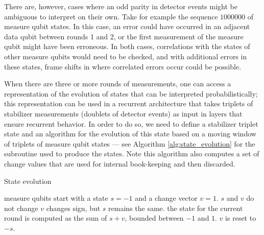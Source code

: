 There are, however, cases where an odd parity in detector events might be ambiguous to interpret on their own. Take for example the sequence $1000000$ of measure qubit states. In this case, an error could have occurred in an adjacent data qubit between rounds 1 and 2, or the first measurement of the measure qubit might have been erroneous. In both cases, correlations with the states of other measure qubits would need to be checked, and with additional errors in these states, frame shifts in where correlated errors occur could be possible.

When there are three or more rounds of measurements, one can access a representation of the evolution of states that can be interpreted probabilistically; this representation can be used in a recurrent architecture that takes triplets of stabilizer measurements (doublets of detector events) as input in layers that ensure recurrent behavior. 
In order to do so, we need to define a stabilizer triplet state and an algorithm for the evolution of this state based on a moving window of triplets of measure qubit states --- see Algorithm \ref{alg:state_evolution} for the subroutine used to produce the states. Note this algorithm also computes a set of change values that are used for internal book-keeping and then discarded.

\begin{algorithm}
\caption{State evolution}
\label{alg:state_evolution}
\begin{algorithmic}[1]
    \State measure qubits start with a state $s=-1$ and a change vector $v=1$.
        \State $s$ and $v$ do not change
    \Else
            \State $v$ changes sign, but $s$ remains the same.
        \Else
            \State the state for the current round is computed as the sum of $s+v$, bounded between $-1$ and $1$.
        \EndIf
    \EndIf
        \State $v$ is reset to $-s$.
    \EndIf
\EndFor
\end{algorithmic}
\end{algorithm}


